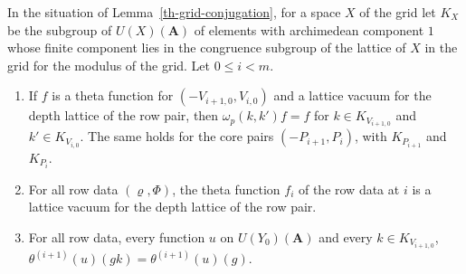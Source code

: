 \begin{lemma}\label{th-depth-fixed}
In the situation of Lemma~\ref{th-grid-conjugation}, for a space $X$ of the grid
let $K_X$ be the subgroup of $U(X)(\mathbf A)$ of elements with archimedean
component $1$ whose finite component lies in the congruence subgroup of the
lattice of $X$ in the grid for the modulus of the grid. Let $0\leq i<m$.
\begin{enumerate}
\item If $f$ is a theta function for $(-V_{i+1,0},V_{i,0})$ and a lattice vacuum
  for the depth lattice of the row pair, then $\omega_p(k,k')f=f$ for
  $k\in K_{V_{i+1,0}}$ and $k'\in K_{V_{i,0}}$. The same holds for the core pairs
  $(-P_{i+1},P_i)$, with $K_{P_{i+1}}$ and $K_{P_i}$.
\item For all row data $(\varrho,\Phi)$, the theta function $f_i$ of the row data
  at $i$ is a lattice vacuum for the depth lattice of the row pair.
\item For all row data, every function $u$ on $U(Y_0)(\mathbf A)$ and every
  $k\in K_{V_{i+1,0}}$, $\theta^{(i+1)}(u)(gk)=\theta^{(i+1)}(u)(g)$.
\end{enumerate}
\end{lemma}
